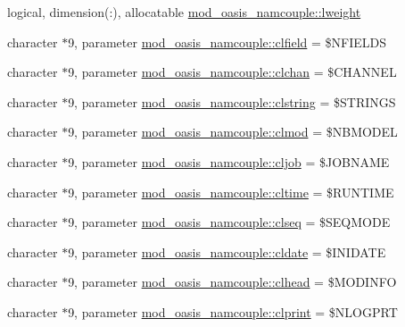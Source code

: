 \begin{DoxyCompactItemize}
\item 
logical, dimension(\+:), allocatable \hyperlink{namespacemod__oasis__namcouple_a8d88d0c1b22ea43a9429f9e3a653a64b}{mod\+\_\+oasis\+\_\+namcouple\+::lweight}
\item 
character $\ast$9, parameter \hyperlink{namespacemod__oasis__namcouple_a1c3afcba25a8ba41738104d42a59e423}{mod\+\_\+oasis\+\_\+namcouple\+::clfield} = \textquotesingle{}\$N\+F\+I\+E\+L\+DS \textquotesingle{}
\item 
character $\ast$9, parameter \hyperlink{namespacemod__oasis__namcouple_ac0ead9ca992504e9b580db2678926b68}{mod\+\_\+oasis\+\_\+namcouple\+::clchan} = \textquotesingle{}\$C\+H\+A\+N\+N\+EL \textquotesingle{}
\item 
character $\ast$9, parameter \hyperlink{namespacemod__oasis__namcouple_a4dde076bf8cce410eebbd878f791e32e}{mod\+\_\+oasis\+\_\+namcouple\+::clstring} = \textquotesingle{}\$S\+T\+R\+I\+N\+GS \textquotesingle{}
\item 
character $\ast$9, parameter \hyperlink{namespacemod__oasis__namcouple_aa5cc4d0530b3e755441ef9ef70d8083b}{mod\+\_\+oasis\+\_\+namcouple\+::clmod} = \textquotesingle{}\$N\+B\+M\+O\+D\+EL \textquotesingle{}
\item 
character $\ast$9, parameter \hyperlink{namespacemod__oasis__namcouple_afbdcab2dcd637c9c70db27c8c46bd2d7}{mod\+\_\+oasis\+\_\+namcouple\+::cljob} = \textquotesingle{}\$J\+O\+B\+N\+A\+ME \textquotesingle{}
\item 
character $\ast$9, parameter \hyperlink{namespacemod__oasis__namcouple_a21a2ef5048e9fc9551821e8a0b8dec0b}{mod\+\_\+oasis\+\_\+namcouple\+::cltime} = \textquotesingle{}\$R\+U\+N\+T\+I\+ME \textquotesingle{}
\item 
character $\ast$9, parameter \hyperlink{namespacemod__oasis__namcouple_a0d0b7fa2be2a8202344c0ef9085c1309}{mod\+\_\+oasis\+\_\+namcouple\+::clseq} = \textquotesingle{}\$S\+E\+Q\+M\+O\+DE \textquotesingle{}
\item 
character $\ast$9, parameter \hyperlink{namespacemod__oasis__namcouple_a0f2d8d935f9088aec74c4dda3e9f5d9c}{mod\+\_\+oasis\+\_\+namcouple\+::cldate} = \textquotesingle{}\$I\+N\+I\+D\+A\+TE \textquotesingle{}
\item 
character $\ast$9, parameter \hyperlink{namespacemod__oasis__namcouple_a15338be5483b1b392e3e5580be75704d}{mod\+\_\+oasis\+\_\+namcouple\+::clhead} = \textquotesingle{}\$M\+O\+D\+I\+N\+FO \textquotesingle{}
\item 
character $\ast$9, parameter \hyperlink{namespacemod__oasis__namcouple_aeaab03598b6067fbecd8d8fc0c54443e}{mod\+\_\+oasis\+\_\+namcouple\+::clprint} = \textquotesingle{}\$N\+L\+O\+G\+P\+RT \textquotesingle{}

\end{DoxyCompactItemize}
